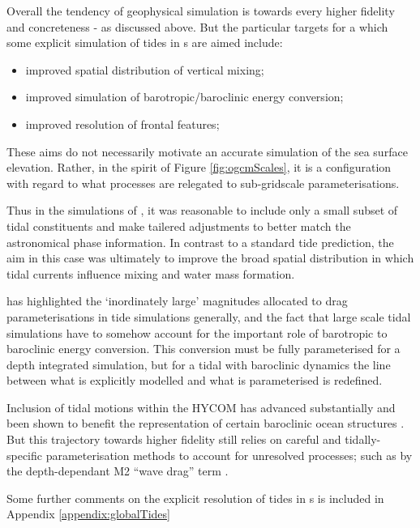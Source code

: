 Overall the tendency of geophysical simulation is towards every higher fidelity and concreteness - as discussed above. But the particular targets for a which some explicit simulation of tides in \OGCM{}s are aimed include:
\begin{itemize}
    \item improved spatial distribution of vertical mixing;
    \item improved simulation of barotropic/baroclinic energy conversion;
    \item improved resolution of frontal features;
\end{itemize}
These aims do not necessarily motivate an accurate simulation of the sea surface elevation.
Rather, in the spirit of Figure \ref{fig:ogcmScales}, it is a configuration with regard to what processes are relegated to sub-gridscale parameterisations.

Thus in the \OFAM{} simulations of \citep{Schiller:2004fv},  it was reasonable to include only a small subset of tidal constituents and make tailered adjustments to better match the astronomical phase information.  In contrast to a standard tide prediction,  the aim in this case was ultimately to improve the broad spatial distribution in which tidal currents influence mixing and water mass formation.

\citep{Arbic:2004wz} has highlighted the `inordinately large' magnitudes allocated to drag parameterisations in tide simulations generally, and the fact that large scale tidal simulations have to somehow account for the important role of barotropic to baroclinic energy conversion.   This conversion must be fully parameterised for a depth integrated simulation, but for a tidal \OGCM{} with baroclinic dynamics the line between what is explicitly modelled and what is parameterised is redefined.  

Inclusion of tidal motions within the HYCOM \OGCM{} has advanced substantially and been shown to benefit the representation of certain baroclinic ocean structures  \citep{10.1016/j.ocemod.2019.02.008}.    But this trajectory towards higher fidelity still relies on careful and tidally-specific parameterisation methods to account for unresolved processes; such as by the depth-dependant M2 ``wave drag'' term \citep{Jayne:2001tr}.

Some further comments on the explicit resolution of tides in \OGCM{}s is included in Appendix \ref{appendix:globalTides}



